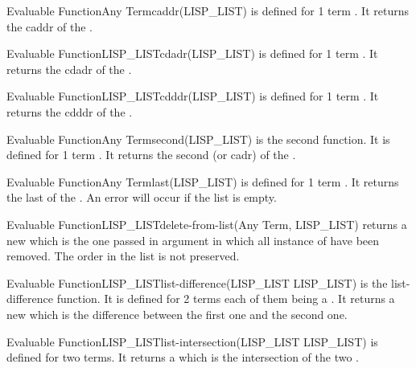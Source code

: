 \begin{typeefa}{Evaluable Function}{Any Term}{caddr}{(LISP\_LIST)}
is defined for 1 term . It returns the caddr  of the
.
\end{typeefa}

\begin{typeefa}{Evaluable Function}{LISP\_LIST}{cdadr}{(LISP\_LIST)}
is defined for 1 term . It returns the cdadr  of the
.
\end{typeefa}

\begin{typeefa}{Evaluable Function}{LISP\_LIST}{cdddr}{(LISP\_LIST)}
is defined for 1 term . It returns the cdddr
 of the .
\end{typeefa}

\begin{typeefa}{Evaluable Function}{Any Term}{second}{(LISP\_LIST)}
is the second function. It is defined for 1 term . It returns
the second (or cadr)  of the .
\end{typeefa}

\begin{typeefa}{Evaluable Function}{Any Term}{last}{(LISP\_LIST)}
 is defined for 1 term . It returns the last  of
 the . An error will occur if the list is empty.
\end{typeefa}

\begin{typeefa}{Evaluable Function}{LISP\_LIST}{delete-from-list}{(Any Term, LISP\_LIST)}
returns a new  which is the one passed in argument in which all
instance of  have been removed. The order in the list is not preserved.
\end{typeefa}

\begin{typeefa}{Evaluable Function}{LISP\_LIST}{list-difference}{(LISP\_LIST
LISP\_LIST)}
is the list-difference function. It is defined for 2 terms each of them
being a . It returns a new  which is the difference
between the first one and the second one.
\end{typeefa}

\begin{typeefa}{Evaluable Function}{LISP\_LIST}{list-intersection}{(LISP\_LIST
LISP\_LIST)} is defined for two  terms. It returns a
 which is the intersection of the two .
\end{typeefa}

